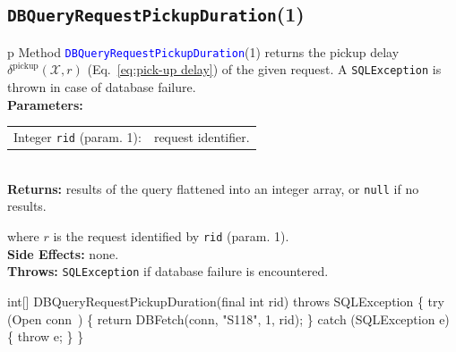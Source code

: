 \subsection{\texttt{DBQueryRequestPickupDuration}(1)}
\begin{tabular}{p{\textwidth}}
\toprule
{}
Method \textcolor{blue}{{\tt{}\protect{}DBQueryRequestPickupDuration}}(1) returns the
pickup delay $\delta^\textrm{pickup}(\mathcal{X},r)$
(Eq.~\ref{eq:pick-up delay}) of the given request.
A {\tt{}SQLException} is thrown in case of database failure.\\
\midrule
\textbf{Parameters:}\\
\begin{tabular}{lp{116mm}}
Integer {\tt{}rid} (param. 1):&request identifier.
\end{tabular}\\
\textbf{Returns:} results of the query flattened into an integer array,
or {\tt{}null} if no results.


where $r$ is the request identified by {\tt{}rid} (param. 1).\\
\textbf{Side Effects:} none.\\
\textbf{Throws:} {\tt{}SQLException} if database failure is encountered.\\
\bottomrule
\end{tabular}
\nwenddocs{}\endmoddef{}
int[] DBQueryRequestPickupDuration(final int rid) throws SQLException \{
  try (\LA{}Open \code{}conn\edoc{}~{\nwtagstyle{}}\RA{}) \{
    return DBFetch(conn, "S118", 1, rid);
  \} catch (SQLException e) \{
    throw e;
  \}
\}
\eatline
{}\nwendcode{}\nwdocspar
